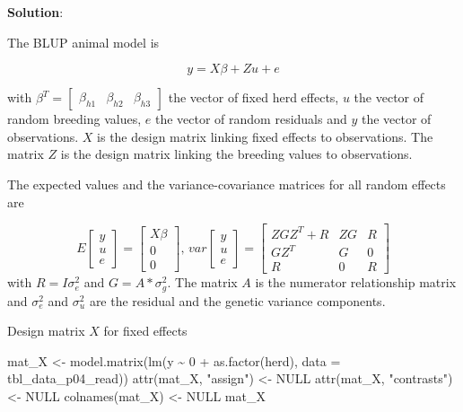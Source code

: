 \documentclass[
]{article}
\newenvironment{Shaded}{\begin{snugshade}}{\end{snugshade}}
\newcommand{\AttributeTok}[1]{\textcolor[rgb]{0.77,0.63,0.00}{#1}}
\newcommand{\ConstantTok}[1]{\textcolor[rgb]{0.00,0.00,0.00}{#1}}
\newcommand{\DecValTok}[1]{\textcolor[rgb]{0.00,0.00,0.81}{#1}}
\newcommand{\FunctionTok}[1]{\textcolor[rgb]{0.00,0.00,0.00}{#1}}
\newcommand{\NormalTok}[1]{#1}
\newcommand{\OtherTok}[1]{\textcolor[rgb]{0.56,0.35,0.01}{#1}}
\newcommand{\SpecialCharTok}[1]{\textcolor[rgb]{0.00,0.00,0.00}{#1}}
\newcommand{\StringTok}[1]{\textcolor[rgb]{0.31,0.60,0.02}{#1}}
\newcommand{\solstart}
{\vspace{3ex}\textbf{Solution}:}
\begin{document}
\solstart

The BLUP animal model is

\[y = X\beta + Zu + e\]

with
\(\beta^T = \left[ \begin{array}{ccc} \beta_{h1} & \beta_{h2} & \beta_{h3} \end{array} \right]\)
the vector of fixed herd effects, \(u\) the vector of random breeding
values, \(e\) the vector of random residuals and \(y\) the vector of
observations. \(X\) is the design matrix linking fixed effects to
observations. The matrix \(Z\) is the design matrix linking the breeding
values to observations.

The expected values and the variance-covariance matrices for all random
effects are

\[
E\left[ \begin{array}{c}y \\ u \\ e \end{array}\right] = \left[ \begin{array}{c} X\beta \\ 0 \\ 0 \end{array}\right] \text{, }
var\left[ \begin{array}{c}y \\ u \\ e \end{array}\right] = \left[ \begin{array}{ccc} ZGZ^T + R &  ZG & R  \\ GZ^T & G & 0 \\ R & 0 & R \end{array}\right]
\] with \(R = I\sigma_e^2\) and \(G = A*\sigma_g^2\). The matrix \(A\)
is the numerator relationship matrix and \(\sigma_e^2\) and
\(\sigma_u^2\) are the residual and the genetic variance components.

Design matrix \(X\) for fixed effects

\begin{Shaded}
\begin{Highlighting}[]
\NormalTok{mat\_X }\OtherTok{\textless{}{-}} \FunctionTok{model.matrix}\NormalTok{(}\FunctionTok{lm}\NormalTok{(y }\SpecialCharTok{\textasciitilde{}} \DecValTok{0} \SpecialCharTok{+} \FunctionTok{as.factor}\NormalTok{(herd), }\AttributeTok{data =}\NormalTok{ tbl\_data\_p04\_read))}
\FunctionTok{attr}\NormalTok{(mat\_X, }\StringTok{"assign"}\NormalTok{) }\OtherTok{\textless{}{-}} \ConstantTok{NULL}
\FunctionTok{attr}\NormalTok{(mat\_X, }\StringTok{"contrasts"}\NormalTok{) }\OtherTok{\textless{}{-}} \ConstantTok{NULL}
\FunctionTok{colnames}\NormalTok{(mat\_X) }\OtherTok{\textless{}{-}} \ConstantTok{NULL}
\NormalTok{mat\_X}
\end{Highlighting}
\end{Shaded}
\end{document}
